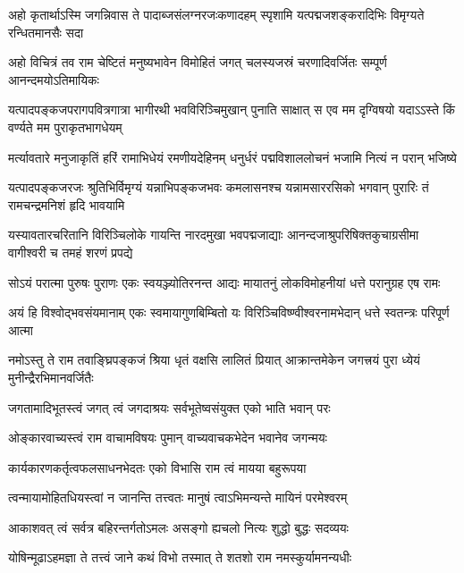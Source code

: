 
\fourlineindentedshloka
{अहो कृतार्थाऽस्मि जगन्निवास ते}
{पादाब्जसंलग्नरजःकणादहम्}
{स्पृशामि यत्पद्मजशङ्करादिभिः}
{विमृग्यते रन्धितमानसैः सदा}%

\fourlineindentedshloka
{अहो विचित्रं तव राम चेष्टितं}
{मनुष्यभावेन विमोहितं जगत्}
{चलस्यजस्रं चरणादिवर्जितः}
{सम्पूर्ण आनन्दमयोऽतिमायिकः}%

\fourlineindentedshloka
{यत्पादपङ्कजपरागपवित्रगात्रा}
{भागीरथी भवविरिञ्चिमुखान्  पुनाति}
{साक्षात् स एव मम दृग्विषयो यदाऽऽस्ते}
{किं वर्ण्यते मम पुराकृतभागधेयम्}%

\fourlineindentedshloka
{मर्त्यावतारे मनुजाकृतिं हरिं}
{रामाभिधेयं रमणीयदेहिनम्}
{धनुर्धरं पद्मविशाललोचनं}
{भजामि नित्यं न परान्  भजिष्ये}%

\fourlineindentedshloka
{यत्पादपङ्कजरजः श्रुतिभिर्विमृग्यं}
{यन्नाभिपङ्कजभवः कमलासनश्च}
{यन्नामसाररसिको भगवान् पुरारिः}
{तं  रामचन्द्रमनिशं हृदि भावयामि}%

\fourlineindentedshloka
{यस्यावतारचरितानि विरिञ्चिलोके}
{गायन्ति नारदमुखा भवपद्मजाद्याः}
{आनन्दजाश्रुपरिषिक्तकुचाग्रसीमा}
{वागीश्वरी च तमहं शरणं प्रपद्ये}%

\fourlineindentedshloka
{सोऽयं परात्मा पुरुषः पुराणः}
{एकः स्वयञ्ज्योतिरनन्त आद्यः}
{मायातनुं लोकविमोहनीयां}
{धत्ते परानुग्रह एष रामः}%

\fourlineindentedshloka
{अयं हि विश्वोद्भवसंयमानाम्}
{एकः  स्वमायागुणबिम्बितो यः}
{विरिञ्चिविष्ण्वीश्वरनामभेदान्}
{धत्ते स्वतन्त्रः परिपूर्ण आत्मा}%

\fourlineindentedshloka
{नमोऽस्तु ते राम तवाङ्घ्रिपङ्कजं}
{श्रिया धृतं वक्षसि लालितं प्रियात्}
{आक्रान्तमेकेन जगत्त्रयं पुरा}
{ध्येयं मुनीन्द्रैरभिमानवर्जितैः}%

\twolineshloka
{जगतामादिभूतस्त्वं जगत् त्वं जगदाश्रयः}
{सर्वभूतेष्वसंयुक्त एको भाति भवान् परः}%

\twolineshloka
{ओङ्कारवाच्यस्त्वं राम वाचामविषयः पुमान्}
{वाच्यवाचकभेदेन भवानेव जगन्मयः}%

\twolineshloka
{कार्यकारणकर्तृत्वफलसाधनभेदतः}
{एको विभासि राम त्वं मायया बहुरूपया}%

\twolineshloka
{त्वन्मायामोहितधियस्त्वां न जानन्ति तत्त्वतः}
{मानुषं त्वाऽभिमन्यन्ते मायिनं परमेश्वरम्}%

\twolineshloka
{आकाशवत् त्वं सर्वत्र बहिरन्तर्गतोऽमलः}
{असङ्गो ह्यचलो नित्यः शुद्धो बुद्धः सदव्ययः}%

\twolineshloka
{योषिन्मूढाऽहमज्ञा ते तत्त्वं जाने कथं विभो}
{तस्मात् ते शतशो राम नमस्कुर्यामनन्यधीः}%

